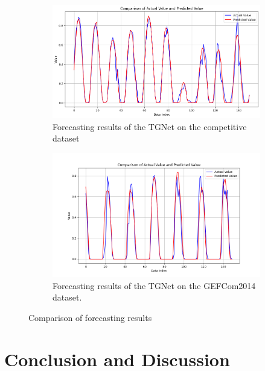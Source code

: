 \documentclass[sn-mathphys-num]{sn-jnl}%
\begin{document}
\begin{figure}[ht!]
    \centering
    \begin{subfigure}[t]{0.46\textwidth}
        \centering
        \includegraphics[width=\textwidth]{output2.png}
        \caption{Forecasting results of the TGNet on the competitive dataset}
        \label{fig:demo1}
    \end{subfigure}
    \hfill %
    \begin{subfigure}[t]{0.45\textwidth}
        \centering
        \includegraphics[width=\textwidth]{output3.png}
        \caption{Forecasting results of the TGNet on the GEFCom2014 dataset.}
        \label{fig:demo2}
    \end{subfigure}
    \caption{Comparison of forecasting results}
    \label{fig:predictions}
\end{figure}

\section{Conclusion and Discussion}\label{sec6}
\end{document}
